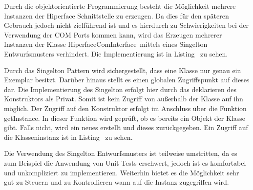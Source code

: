 Durch die objektorientierte Programmierung besteht die Möglichkeit mehrere Instanzen der Hiperface Schnittstelle zu erzeugen. Da dies für den späteren Gebrauch jedoch nicht zielführend ist und es hierdurch zu Schwierigkeiten bei der Verwendung der COM Ports kommen kann, wird das Erzeugen mehrerer Instanzen der Klasse \dq HiperfaceComInterface\dq~mittels eines Singelton Entwurfsmusters verhindert. Die Implementierung ist in Listing \dq {}\dq~zu sehen.	 
\newline
\begin{center}

\begin{minipage}[h]{\textwidth}
	
\end{minipage}

\end{center}
Durch das Singelton Pattern wird sichergestellt, dass eine Klasse nur genau ein Exemplar besitzt. Darüber hinaus stellt es einen globalen Zugriffspunkt auf dieses dar.\cite{Gamma.2008} Die Implementierung des Singelton erfolgt hier durch das deklarieren des Konstruktors als \dq Privat\dq. Somit ist kein Zugriff von außerhalb der Klasse auf ihn möglich. Der Zugriff auf den Konstruktor erfolgt im Anschluss über die Funktion \dq getInstance\dq. In dieser Funktion wird geprüft, ob es bereits ein Objekt der Klasse gibt. Falls nicht, wird ein neues erstellt und dieses zurückgegeben. Ein Zugriff auf die Klasseninstanz ist in Listing \dq {}\dq~zu sehen.
\newline
\begin{center}

\begin{minipage}[h]{\textwidth}
	
\end{minipage}

\end{center}
Die Verwendung des Singelton Entwurfsmusters ist teilweise umstritten, da es zum Beispiel die Anwendung von Unit Tests erschwert, jedoch ist es komfortabel und unkompliziert zu implementieren. Weiterhin bietet es die Möglichkeit sehr gut zu Steuern und zu Kontrollieren wann auf die Instanz zugegriffen wird. 
